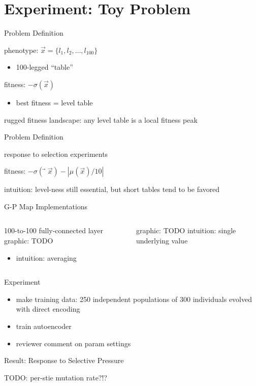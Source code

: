 \section{Experiment: Toy Problem}

\begin{frame}{Problem Definition}

phenotype: $\vec{x} = \{l_1, l_2, \dots, l_{100} \}$
\begin{itemize}
\item 100-legged ``table''
\end{itemize}

fitness: $−\sigma(\vec{x})$
\begin{itemize}
\item best fitness = level table
\end{itemize}

rugged fitness landscape:
any level table is a local fitness peak

\end{frame}

\begin{frame}{Problem Definition}

response to selection experiments

fitness:
$−\sigma(⃗\vec{x}) − |\mu(\vec{x})/10 |$


intuition:
level-ness still essential, but short tables tend to be favored

\end{frame}

\begin{frame}{G-P Map Implementations}

\begin{columns}
\begin{column}{0.5\textwidth}
100-to-100 fully-connected layer
graphic: TODO
\begin{itemize}
\item intuition: averaging
\end{itemize}
\end{column}
\begin{column}{0.5\textwidth}
graphic: TODO
intuition: single underlying value
\end{column}
\end{columns}

\end{frame}

\begin{frame}{Experiment}

\begin{itemize}
\item make training data: 250 independent populations of 300 individuals evolved with direct encoding
\item train autoencoder
\item reviewer comment on param settings %
\end{itemize}

\end{frame}


\begin{frame}{Result: Response to Selective Pressure}



TODO: per-stie mutation rate?!?

\end{frame}
